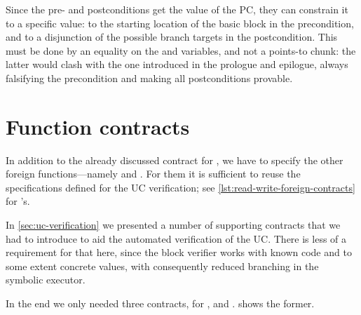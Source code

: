 Since the pre- and postconditions get the value of the PC, they can constrain it to a specific value: to the starting location of the basic block in the precondition, and to a disjunction of the possible branch targets in the postcondition. This must be done by an equality on the  and  variables, and not a points-to chunk: the latter would clash with the one introduced in the prologue and epilogue, always falsifying the precondition and making all postconditions provable.

\section{Function contracts}

In addition to the already discussed contract for , we have to specify the other foreign functions---namely  and . For them it is sufficient to reuse the specifications defined for the UC verification; see \cref{lst:read-write-foreign-contracts} for 's.

In \cref{sec:uc-verification} we presented a number of supporting contracts that we had to introduce to aid the automated verification of the UC. There is less of a requirement for that here, since the block verifier works with known code and to some extent concrete values, with consequently reduced branching in the symbolic executor.

In the end we only needed three contracts, for ,  and .  shows the former.

